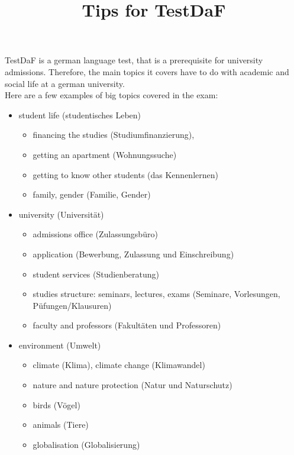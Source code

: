 \documentclass[12pt]{article}
\title{Tips for TestDaF}
\begin{document}
\setlength{\parindent}{0pt}

\maketitle

\def\myspace{\vspace{0.7em}}

TestDaF is a german language test, that is a prerequisite for university admissions. 
Therefore, the main topics it covers have to do with academic and social life at a german university.\\

Here are a few examples of big topics covered in the exam:
\begin{itemize}
    \item student life (studentisches Leben)
        \begin{itemize}
            \item financing the studies (Studiumfinanzierung), 
            \item getting an apartment (Wohnungssuche)
            \item getting to know other students (das Kennenlernen)
            \item family, gender (Familie, Gender)         
        \end{itemize}
        
    \item university (Universit\"at)
        \begin{itemize}
            \item admissions office (Zulassungsb\"uro)
            \item application (Bewerbung, Zulassung und Einschreibung)
            \item student services (Studienberatung)
            \item studies structure: seminars, lectures, exams (Seminare, Vorlesungen, P\"ufungen/Klausuren)     
            \item faculty and professors (Fakult\"aten und Professoren)       
        \end{itemize}

    \item environment (Umwelt)
        \begin{itemize}
            \item climate (Klima), climate change (Klimawandel)
            \item nature and nature protection (Natur und Naturschutz)
            \item birds (V\"ogel)
            \item animals (Tiere)
            \item globalisation (Globalisierung)      
        \end{itemize}
        

\end{itemize}
\end{document}
